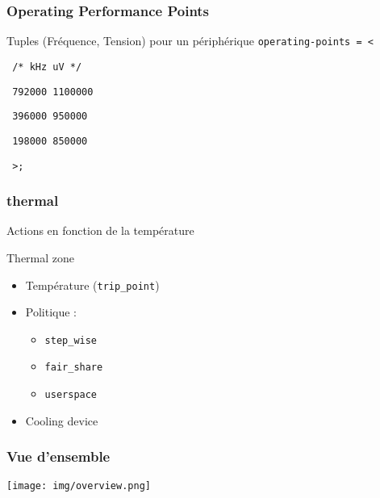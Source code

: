 \begin{frame}
	\frametitle{Operating Performance Points}
	\begin{block}{Tuples (Fréquence, Tension) pour un périphérique}
	\texttt{operating-points = <}

	\texttt{     /* kHz    uV */}

	\texttt{     792000  1100000}

	\texttt{     396000  950000}

	\texttt{     198000  850000}

	\texttt{     >;}
	\end{block}
\end{frame}
\begin{frame}
	\frametitle{thermal}
	Actions en fonction de la température
	\begin{block}{Thermal zone}
		\begin{itemize}
			\item<2-> Température (\texttt{trip\_point})
			\item<3-> Politique :
				\begin{itemize}
					\item<4-> \texttt{step\_wise}
					\item<5-> \texttt{fair\_share}
					\item<6-> \texttt{userspace}
				\end{itemize}
			\item<7-> Cooling device
		\end{itemize}
	\end{block}
\end{frame}

\begin{frame}
	\frametitle{Vue d'ensemble}
	\begin{center}
		\texttt{[image: img/overview.png]}
	\end{center}
\end{frame}
